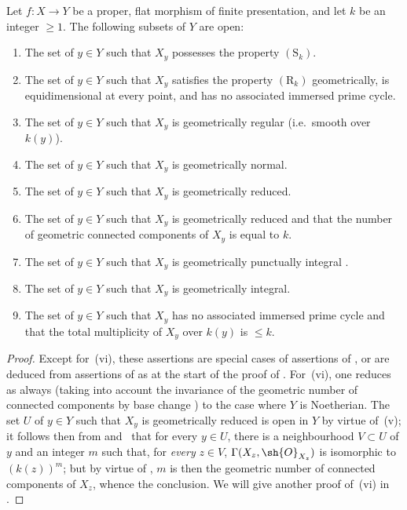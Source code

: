 \begin{theorem}[12.2.4]
\label{IV.12.2.4}
Let $f:X\to Y$ be a proper, flat morphism of finite presentation, and let $k$ be an integer $\geqslant 1$.
The following subsets of $Y$ are open:
\begin{enumerate}[label=(\roman*)]
  \item The set of $y\in Y$ such that $X_y$ possesses the property $(\mathrm{S}_k)$.
  \item The set of $y\in Y$ such that $X_y$ satisfies the property $(\mathrm{R}_k)$ geometrically, is equidimensional at every point, and has no associated immersed prime cycle.
  \item The set of $y\in Y$ such that $X_y$ is geometrically regular (i.e.\ smooth over $k(y)$).
  \item The set of $y\in Y$ such that $X_y$ is geometrically normal.
  \item The set of $y\in Y$ such that $X_y$ is geometrically reduced.
  \item The set of $y\in Y$ such that $X_y$ is geometrically reduced and that the number of geometric connected components of $X_y$ is equal to $k$.
  \item The set of $y\in Y$ such that $X_y$ is geometrically punctually integral .
  \item The set of $y\in Y$ such that $X_y$ is geometrically integral.
  \item The set of $y\in Y$ such that $X_y$ has no associated immersed prime cycle and that the total multiplicity  of $X_y$ over $k(y)$ is $\leqslant k$.
\end{enumerate}
\end{theorem}

\begin{proof}
Except for~(vi), these assertions are special cases of assertions of , or are deduced from assertions of  as at the start of the proof of .
For~(vi), one reduces as always (taking into account the invariance of the geometric number of connected components by base change ) to the case where $Y$ is Noetherian.
The set $U$ of $y\in Y$ such that $X_y$ is geometrically reduced is open in $Y$ by virtue of~(v); it follows then from  and~ that for every $y\in U$, there is a neighbourhood $V\subset U$ of $y$ and an integer $m$ such that, for \emph{every} $z\in V$, $\Gamma(X_z,\sh{O}_{X_z})$ is isomorphic to $(k(z))^m$; but by virtue of , $m$ is then the geometric number of connected components of $X_z$, whence the conclusion.
We will give another proof of~(vi) in .
\end{proof}


